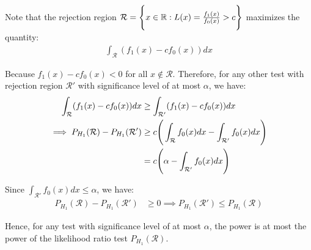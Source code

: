 \begin{proof*}
    Note that the rejection region $\mathcal{R} = \Bigg\{  x \in \mathbb{R} : L(x) = \frac{f_1(x)}{f_0(x)} > c  \Bigg\}$ maximizes the quantity:
    \begin{align*}
        \int_{\mathcal{R}} (f_1(x) - cf_0(x))dx
    \end{align*}

    \noindent Because $f_1(x) - cf_0(x) < 0$ for all $x\notin\mathcal{R}$. Therefore, for any other test with rejection region $\mathcal{R}'$ with significance level of at most $\alpha$, we have:
    \begin{align*}
        \int_{\mathcal{R}} (f_1(x) - cf_0(x))dx 
            &\ge \int_{\mathcal{R}'} (f_1(x) - cf_0(x))dx \\
        \implies
        P_{H_1}(\mathcal{R}) - P_{H_1}(\mathcal{R}') 
            &\ge 
            c \Bigg( 
                \int_{\mathcal{R}} f_0(x)dx -  \int_{\mathcal{R}'} f_0(x)dx
             \Bigg) \\
            &= c \Bigg( 
                \alpha -  \int_{\mathcal{R}'} f_0(x)dx
             \Bigg) \\
    \end{align*} 

    \noindent Since $\int_{\mathcal{R}'} f_0(x)dx \le \alpha$, we have:
    \begin{align*}
        P_{H_1}(\mathcal{R}) - P_{H_1}(\mathcal{R}') 
            &\ge 0 \implies P_{H_1}(\mathcal{R}') \le P_{H_1}(\mathcal{R})
    \end{align*} 

    \noindent Hence, for any test with significance level of at most $\alpha$, the power is at most the power of the likelihood ratio test $P_{H_1}(\mathcal{R})$.
\end{proof*}


